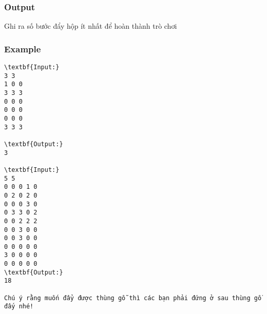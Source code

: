 \subsubsection{Output}

Ghi ra số bước đẩy hộp ít nhất để hoàn thành trò chơi

\subsubsection{Example}
\begin{verbatim}
\textbf{Input:}
3 3
1 0 0
3 3 3
0 0 0
0 0 0
0 0 0
3 3 3

\textbf{Output:}
3

\textbf{Input:}
5 5
0 0 0 1 0
0 2 0 2 0
0 0 0 3 0
0 3 3 0 2
0 0 2 2 2
0 0 3 0 0
0 0 3 0 0
0 0 0 0 0
3 0 0 0 0
0 0 0 0 0
\textbf{Output:}
18

Chú ý rằng muốn đẩy được thùng gỗ thì các bạn phải đứng ở sau thùng gỗ đấy nhé!
\end{verbatim}
